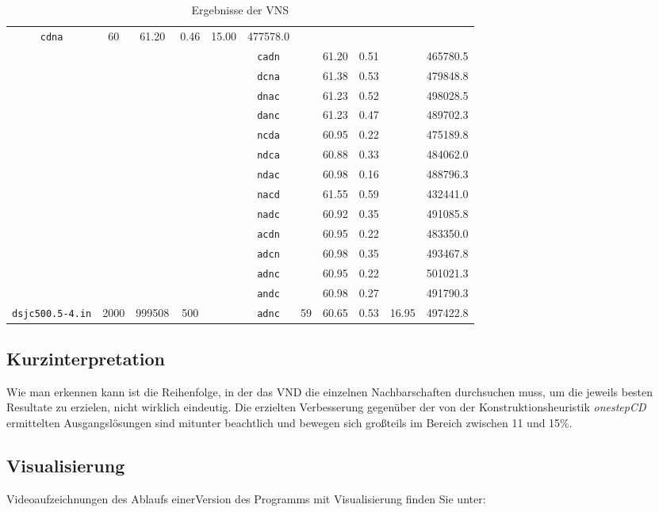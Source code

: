 \documentclass[paper=a4,fontsize=12pt]{scrartcl}
\begin{document}
\begin{table}[p]
\begin{tabular}{|c|ccc|c|c|ccc|c|c|}
      \texttt{cdna}	& \multirow{14}{*}{60}	& 61.20	& 0.46	& \multirow{14}{*}{15.00}	& 477578.0\\
&&&&& \texttt{cadn}	&			& 61.20	& 0.51	&				& 465780.5\\
&&&&& \texttt{dcna}	&			& 61.38	& 0.53	&				& 479848.8\\
&&&&& \texttt{dnac}	&			& 61.23	& 0.52	&				& 498028.5\\
&&&&& \texttt{danc}	&			& 61.23	& 0.47	&				& 489702.3\\
&&&&& \texttt{ncda}	&			& 60.95	& 0.22	&				& 475189.8\\
&&&&& \texttt{ndca}	&			& 60.88	& 0.33	&				& 484062.0\\
&&&&& \texttt{ndac}	&			& 60.98	& 0.16	&				& 488796.3\\
&&&&& \texttt{nacd}	&			& 61.55	& 0.59	&				& 432441.0\\
&&&&& \texttt{nadc}	&			& 60.92	& 0.35	&				& 491085.8\\
&&&&& \texttt{acdn}	&			& 60.95	& 0.22	&				& 483350.0\\
&&&&& \texttt{adcn}	&			& 60.98	& 0.35	&				& 493467.8\\
&&&&& \texttt{adnc}	&			& 60.95	& 0.22	&				& 501021.3\\
&&&&& \texttt{andc}	&			& 60.98	& 0.27	&				& 491790.3\\
\cline{1-4}\cline{6-11}
\texttt{dsjc500.5-4.in} & 2000 & 999508 & 500 & & \texttt{adnc} & 59 & 60.65 & 0.53 & 16.95 & 497422.8\\
\hline
\end{tabular}
\caption{Ergebnisse der VNS}
\label{tab:result}
\end{table}

\subsection{Kurzinterpretation}
Wie man erkennen kann ist die Reihenfolge, in der das VND die einzelnen Nachbarschaften durchsuchen muss, um die jeweils besten Resultate zu erzielen, nicht wirklich eindeutig. Die erzielten Verbesserung gegenüber der von der Konstruktionsheuristik \emph{onestepCD} ermittelten Ausgangslösungen sind mitunter beachtlich und bewegen sich großteils im Bereich zwischen 11 und 15\%.
\subsection{Visualisierung}

Videoaufzeichnungen des Ablaufs einerVersion des Programms mit Visualisierung finden Sie unter:
\end{document}
